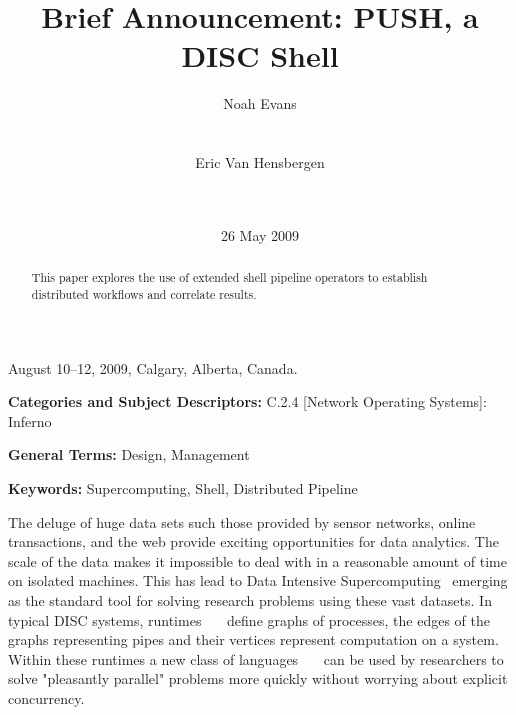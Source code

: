 \documentclass{sig-alt-release2}
\begin{document}
 {August 10--12, 2009, Calgary, Alberta, Canada.} 
\title{Brief Announcement: PUSH, a DISC Shell}

\author{
\alignauthor Noah Evans \\
\\
\\
\alignauthor Eric Van Hensbergen \\
\\
\\
}
\date{26 May 2009}

\maketitle

\begin{abstract}
This paper explores the use of extended shell pipeline operators to
establish distributed workflows and correlate results.
\end{abstract}

\vspace{1mm}
\noindent
{\bf Categories and Subject Descriptors:} C.2.4 {[Network Operating Systems]}: {Inferno}

\vspace{1mm}
\noindent
{\bf General Terms:} Design, Management 

\vspace{1mm}
\noindent
{\bf Keywords:} Supercomputing, Shell, Distributed Pipeline

The deluge of huge data sets such those provided by sensor networks, 
online transactions, and the web provide exciting opportunities for data
analytics.  The scale of the data makes it impossible to deal with in a
reasonable amount of time on isolated machines.
This has lead to Data Intensive Supercomputing~\cite{bryant2007dis} emerging
as the standard tool for solving research problems using these vast datasets.
In typical DISC systems, 
runtimes~\cite{dean2008msd}~\cite{bialecki:hfr}~\cite{isard2007ddd} define 
graphs of processes, the edges of the graphs representing 
pipes and their vertices represent computation on a system.  
Within these runtimes a new class of 
languages~\cite{pike2005idp}~\cite{yu2008dsg}~\cite{olston2008pln} can be used by researchers to solve "pleasantly parallel" 
problems more quickly without worrying about explicit concurrency.
\end{document}
